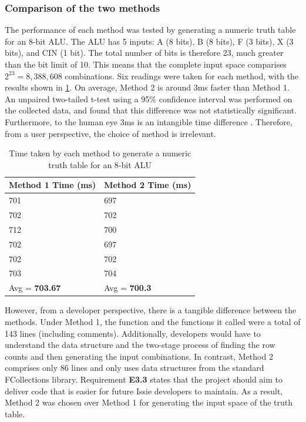 \subsubsection{Comparison of the two methods}
The performance of each method was tested by generating a numeric truth table for an 8-bit ALU. The ALU has 5 inputs: A (8 bits), B (8 bits), F (3 bits), X (3 bits), and CIN (1 bit). The total number of bits is therefore 23, much greater than the bit limit of 10. This means that the complete input space comparises $2^{23} = 8,388,608$ combinations. Six readings were taken for each method, with the results shown in \ref{tab:ttGenPerformance}. On average, Method 2 is around 3ms faster than Method 1. An unpaired two-tailed t-test using a 95\% confidence interval was performed on the collected data, and found that this difference was not statistically significant. Furthermore, to the human eye 3ms is an intangible time difference \cite{Miller1968ResponseTI}. Therefore, from a user perspective, the choice of method is irrelevant.

\begin{table}[!ht]
    \centering
    \begin{tabular}{|l|l|}
    \hline
        Method 1 Time (ms) & Method 2 Time (ms) \\ \hline
        701 & 697 \\ \hline
        702 & 702 \\ \hline
        712 & 700 \\ \hline
        702 & 697 \\ \hline
        702 & 702 \\ \hline
        703 & 704 \\ \hline
        Avg = \textbf{703.67} & Avg = \textbf{700.3} \\ \hline
    \end{tabular}
    \caption{Time taken by each method to generate a numeric truth table for an 8-bit ALU}
    \label{tab:ttGenPerformance}
\end{table}

However, from a developer perspective, there is a tangible difference between the methods. Under Method 1, the  function and the functions it called were a total of 143 lines (including comments). Additionally, developers would have to understand the  data structure and the two-stage process of finding the row counts and then generating the input combinations. In contrast, Method 2 comprises only 86 lines and only uses data structures from the standard F\fsharp Collections library. Requirement \textbf{E3.3} states that the project should aim to deliver code that is easier for future Issie developers to maintain. As a result, Method 2 was chosen over Method 1 for generating the input space of the truth table.

